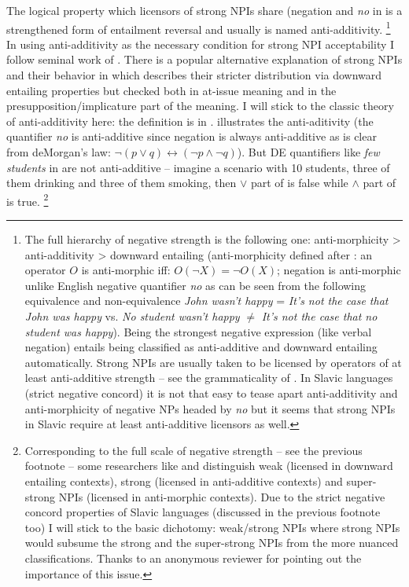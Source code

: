 \documentclass[output=paper,
]{langscibook}
\begin{document}
\ea\label{ex-18} 
\label{ex-18-b}
\z
\z

\noindent The logical property which licensors of strong NPIs share (negation and \textit{no} in  is a strengthened form of entailment reversal and usually is named anti-additivity.%
\footnote{The full hierarchy of negative strength is the following one: anti-morphicity > anti-additivity > downward entailing (anti-morphicity defined after \citealt{krifka1995semantics}: an operator $O$ is anti-morphic iff: $O(\neg X)=\neg O(X)$; negation is anti-morphic unlike English negative quantifier \textit{no} as can be seen from the following equivalence and non-equivalence \textit{John wasn't happy} = \textit{It's not the case that John was happy} vs. \textit{No student wasn't happy} $\neq$ \textit{It's not the case that no student was happy}). Being the strongest negative expression (like verbal negation) entails being classified as anti-additive and downward entailing automatically. Strong NPIs are usually taken to be licensed by operators of at least anti-additive strength -- see the grammaticality of . In Slavic languages (strict negative concord) it is not that easy to tease apart anti-additivity and anti-morphicity of negative NPs headed by \textit{no} but it seems that strong NPIs in Slavic require at least anti-additive licensors as well.}
In using anti-additivity as the necessary condition for strong NPI acceptability I follow seminal work of \cite{zwarts1998three}. There is a popular alternative explanation of strong NPIs and their behavior in \cite{gajewski2011licensing} which describes their stricter distribution via downward entailing properties but checked both in at-issue meaning and in the presupposition/implicature part of the meaning. I will stick to the classic theory of anti-additivity here: the definition is in .  illustrates the anti-aditivity (the quantifier \textit{no} is anti-additive since negation is always anti-additive as is clear from deMorgan's law: $\neg(p \vee q) \leftrightarrow (\neg p \wedge \neg q)$). But DE quantifiers like \textit{few students} in  are not anti-additive -- imagine a scenario with 10 students, three of them drinking and three of them smoking, then $\vee$ part of  is false while $\wedge$ part of  is true.%
\footnote{Corresponding to the full scale of negative strength -- see the previous footnote -- some researchers like \citet{krifka1995semantics} and \citet{van2002negative} distinguish weak (licensed in downward entailing contexts), strong (licensed in anti-additive contexts) and super-strong NPIs (licensed in anti-morphic contexts). Due to the strict negative concord properties of Slavic languages (discussed in the previous footnote too) I will stick to the basic dichotomy: weak/strong NPIs where strong NPIs would subsume the strong and the super-strong NPIs from the more nuanced classifications. Thanks to an anonymous reviewer for pointing out the importance of this issue.}
\end{document}
